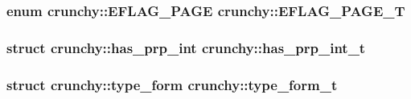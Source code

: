 \subsubsection[{E\+F\+L\+A\+G\+\_\+\+P\+A\+G\+E\+\_\+\+T}]{\setlength{\rightskip}{0pt plus 5cm}enum {\bf crunchy\+::\+E\+F\+L\+A\+G\+\_\+\+P\+A\+G\+E}  crunchy\+::\+E\+F\+L\+A\+G\+\_\+\+P\+A\+G\+E\+\_\+\+T\hspace{0.3cm}{\ttfamily [static]}}\label{namespacecrunchy_aae55d30a37cf91c7ece1e1bd5362b884}
\hypertarget{namespacecrunchy_af87c811f546c4e2e1286afbd8b7f8214}{}
\subsubsection[{has\+\_\+prp\+\_\+int\+\_\+t}]{\setlength{\rightskip}{0pt plus 5cm}struct {\bf crunchy\+::has\+\_\+prp\+\_\+int}  crunchy\+::has\+\_\+prp\+\_\+int\+\_\+t}\label{namespacecrunchy_af87c811f546c4e2e1286afbd8b7f8214}
\hypertarget{namespacecrunchy_a485eab134ce624b5c2330b623928030f}{}
\subsubsection[{type\+\_\+form\+\_\+t}]{\setlength{\rightskip}{0pt plus 5cm}struct {\bf crunchy\+::type\+\_\+form}  crunchy\+::type\+\_\+form\+\_\+t}\label{namespacecrunchy_a485eab134ce624b5c2330b623928030f}
